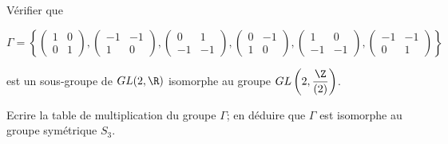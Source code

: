 Vérifier que 

\[
\Gamma = 
\left\{
\begin{pmatrix}
    1 & 0 \\
    0 & 1
\end{pmatrix},
\begin{pmatrix}
    -1 & -1 \\
    1 & 0 
\end{pmatrix},
\begin{pmatrix}
    0 & 1 \\
    -1 & -1
\end{pmatrix},
\begin{pmatrix}
    0 & -1 \\
    1 & 0
\end{pmatrix},
\begin{pmatrix}
    1 & 0 \\
    -1 & -1
\end{pmatrix},
\begin{pmatrix}
    -1 & -1 \\
    0 & 1
\end{pmatrix}
\right\}
\]

est un sous-groupe de $GL(2,\R)$ isomorphe au groupe $GL \left( 2, \dfrac{\Z}{(2)}  \right)$.

Ecrire la table de multiplication du groupe $\Gamma$; en déduire que $\Gamma$ est isomorphe au groupe symétrique $S_3$.